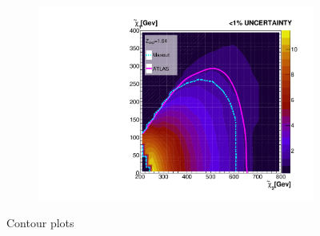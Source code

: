 \begin{figure}[H]
{\begin{subfigure}{.45\textwidth}
        \vspace{-0.75cm}
        \vspace*{-33.1ex}  %
        \begin{center}
        \tiny
        \hspace{-44.5ex}
        \cite{atlas_search_2021}
        \end{center}
        \vspace*{34.1ex}
        \vspace{-1.cm}
        \caption{}
        \label{fig:MaxOutLimit10}
    \end{subfigure}
    \hfill
    \begin{subfigure}{.45\textwidth}
        \includegraphics[width=\textwidth]{Figures/MLResults/NN/SUSY/Comparison/Limits/MaxOutLimit1.pdf}
        \vspace{-0.75cm}
        \vspace*{-33.1ex}  %
        \begin{center}
        \tiny
        \hspace{-44.5ex}
        \cite{atlas_search_2021}
        \end{center}
        \vspace*{34.1ex}
        \vspace{-1.cm}
        \caption{}
        \label{fig:MaxOutLimit1}
    \end{subfigure}
    }
    \caption[Contour plots 
    of the significance achieved by the ordinary dense \ac{NN} and maxout model on the full statistics signal set. Contours are drawn 
    around the band equal to a significance of 1.64 for each model respectively (cyan) and for the \ac{ATLAS} analysis (pink).]{ Contour plots 
}
\end{figure}
